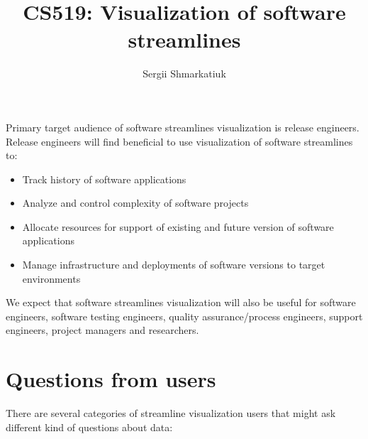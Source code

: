 \documentclass[journal]{vgtc}                %
\title{CS519: Visualization of software streamlines}
\author{Sergii Shmarkatiuk}
\begin{document}


\maketitle

Primary target audience of software streamlines visualization is release engineers. Release engineers will find beneficial to use visualization of software streamlines to: 
\begin{itemize}
\item Track history of software applications
\item Analyze and control complexity of software projects
\item Allocate resources for support of existing and future version of software applications
\item Manage infrastructure and deployments of software versions to target environments
\end{itemize}
We expect that software streamlines visualization will also be useful for software engineers, software testing engineers, quality assurance/process engineers, support engineers, project managers and researchers.

\section{Questions from users}
There are several categories of streamline visualization users that might ask different kind of questions about data:
\end{document}

